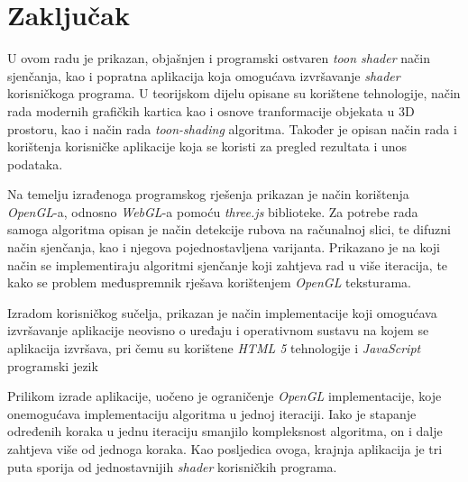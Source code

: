 \section{Zaključak}

U ovom radu je prikazan, objašnjen i programski ostvaren \emph{toon shader} način sjenčanja, kao i popratna aplikacija koja omogućava izvršavanje \emph{shader} korisničkoga programa. U teorijskom dijelu opisane su korištene tehnologije, način rada modernih grafičkih kartica kao i osnove tranformacije objekata u 3D prostoru, kao i način rada \emph{toon-shading} algoritma. Također je opisan način rada i korištenja korisničke aplikacije koja se koristi za pregled rezultata i unos podataka.

Na temelju izrađenoga programskog rješenja prikazan je način korištenja \emph{OpenGL}-a, odnosno \emph{WebGL}-a pomoću \emph{three.js} biblioteke. Za potrebe rada samoga algoritma opisan je način detekcije rubova na računalnoj slici, te difuzni način sjenčanja, kao i njegova pojednostavljena varijanta. Prikazano je na koji način se implementiraju algoritmi sjenčanje koji zahtjeva rad u više iteracija, te kako se problem međuspremnik rješava korištenjem \emph{OpenGL} teksturama.

Izradom korisničkog sučelja, prikazan je način implementacije koji omogućava izvršavanje aplikacije neovisno o uređaju i operativnom sustavu na kojem se aplikacija izvršava, pri čemu su korištene \emph{HTML 5} tehnologije i \emph{JavaScript} programski jezik

Prilikom izrade aplikacije, uočeno je ograničenje \emph{OpenGL} implementacije, koje onemogućava implementaciju algoritma u jednoj iteraciji. Iako je stapanje određenih koraka u jednu iteraciju smanjilo kompleksnost algoritma, on i dalje zahtjeva više od jednoga koraka. Kao posljedica ovoga, krajnja aplikacija je tri puta sporija od jednostavnijih \emph{shader}  korisničkih programa.